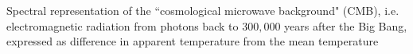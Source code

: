 \begin{slide}
\begin{block}{}
\begin{columns}
Spectral representation of the ``cosmological microwave background" (CMB),
i.e.~ electromagnetic radiation from photons back to $300,000$ years
after the Big Bang, expressed as difference in apparent temperature from the mean
temperature

\end{columns}
\end{block}
\end{slide}
